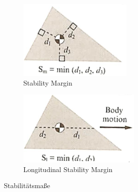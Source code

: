 \begin{itemize}
\begin{itemize}
\begin{figure}[h!]
\begin{subfigure}{.3\textwidth}
		\includegraphics[width=\textwidth]{figures/ch06_stabmarg.png}
		\caption{Stability Margin}
		\label{StabMarg}
	\end{subfigure}
	\begin{subfigure}{.3\textwidth}
		\includegraphics[width=\textwidth]{figures/ch06_longstabmarg.png}
		\caption{Longitudinal Stability Margin}
		\label{LongStabMarg}
	\end{subfigure}
	\caption{Stabilitätsmaße}
\end{figure}
\end{itemize} 
\end{itemize}
